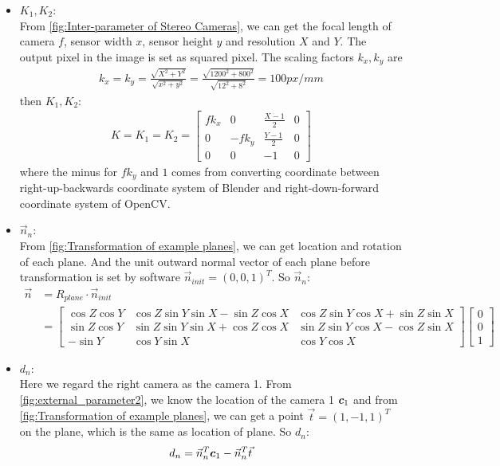\begin{itemize}
	\item {\Large $K_{1},K_{2}$}: \\
	From \cref{fig:Inter-parameter of Stereo Cameras}, we can get the focal length of camera $f$, sensor width $x$, sensor height $y$ and resolution $X$ and $Y$. The output pixel in the image is set as squared pixel. The scaling factors $k_{x}, k_{y}$ are
	\begin{align}
		k_{x} = k_{y} = \frac{\sqrt{X^2 + Y^2}}{\sqrt{x^2 + y^2}} = \frac{\sqrt{1200^2 + 800^2}}{\sqrt{12^2 + 8^2}} = 100 px/mm 
	\end{align}
	then $K_{1},K_{2}$:
	\begin{align}
	K = K_{1}=K_{2} = \begin{bmatrix}
	f k_{x} & 0 & \frac{X-1} {2} & 0 \\
	0 & -f k_{y} &  \frac{Y-1} {2} & 0 \\
	0 & 0 & -1 & 0
	\end{bmatrix} 
	\end{align}
	where the minus for $f k_{y}$ and $1$ comes from converting coordinate between right-up-backwards coordinate system of Blender and right-down-forward coordinate system of OpenCV.
	
	\item {\Large $\vec{n}_n$}: \\
	From \cref{fig:Transformation of example planes}, we can get location and rotation of each plane. And the unit outward normal vector of each plane before transformation is set by software $\vec{n}_{init} = (0, 0, 1)^T$. So $\vec{n}_n$:
	\begin{align}
		\vec{n} &= R_{plane} \cdot \vec{n}_{init} \nonumber \\
						&= \begin{bmatrix}
							\cos Z \cos Y & \cos Z \sin Y \sin X - \sin Z \cos X& \cos Z \sin Y \cos X + \sin Z \sin X\\
							\sin Z \cos Y & \sin Z \sin Y \sin X + \cos Z \cos X & \sin Z \sin Y \cos X -\cos Z \sin X \\
							-\sin Y& \cos Y \sin X& \cos Y \cos X
						\end{bmatrix} \begin{bmatrix}
						0\\0\\1
						\end{bmatrix}
	\end{align}
	\item {\Large $d_n$}: \\
	Here we regard the right camera as the camera 1. From \cref{fig:external_parameter2}, we know the location of the camera 1 $\boldsymbol{c}_1$ and from \cref{fig:Transformation of example planes}, we can get a point $\vec{t} = (1, -1, 1)^T$ on the plane, which is the same as location of plane. So $d_n$:
	\begin{align}
	d_n = \vec{n}_n^T \boldsymbol{c}_1 - \vec{n}_n^T \vec{t}
	\end{align}
\end{itemize}

